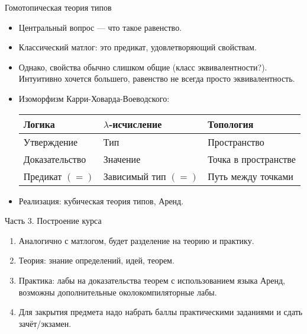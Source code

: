 \documentclass[aspectratio=169]{beamer}
\begin{document}
\begin{frame}[fragile]{Гомотопическая теория типов}
\begin{itemize}
\item Центральный вопрос --- что такое равенство.
\item Классический матлог: это предикат, удовлетворяющий свойствам.
\item Однако, свойства обычно слишком общие (класс эквивалентности?). Интуитивно хочется большего,
равенство не всегда просто эквивалентность.
\item Изоморфизм Карри-Ховарда-Воеводского:
\begin{tabular}{lll}
Логика & $\lambda$-исчисление & Топология\\\hline
Утверждение & Тип & Пространство \\
Доказательство & Значение & Точка в пространстве\\
Предикат $(=)$ & Зависимый тип $(=)$ & Путь между точками
\end{tabular}
\item Реализация: кубическая теория типов, Аренд.
\end{itemize}
\end{frame}

\begin{frame}{Часть 3. Построение курса}
\begin{enumerate}
\item Аналогично с матлогом, будет разделение на теорию и практику.
\item Теория: знание определений, идей, теорем.
\item Практика: лабы на доказательства теорем с использованием языка Аренд, возможны дополнительные околокомпиляторные лабы.
\item Для закрытия предмета надо набрать баллы практическими заданиями и сдать зачёт/экзамен.
\end{enumerate}
\end{frame}
\end{document}
